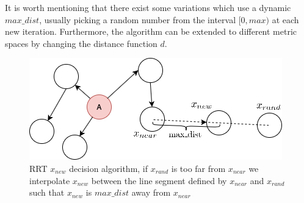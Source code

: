 It is worth mentioning that there exist some variations which use a dynamic $max\_dist$, usually picking a random number from the interval $[0, max)$ at each new iteration. Furthermore, the algorithm can be extended to different metric spaces by changing the distance function $d$.

\begin{figure}[]
  \centering
  \includegraphics[scale=0.4]{images/RRT_new_node.png}
  \caption{RRT $x_{new}$ decision algorithm, if $x_{rand}$ is too far from $x_{near}$ we interpolate $x_{new}$ between the line segment defined by $x_{near}$ and $x_{rand}$ such that $x_{new}$ is $max\_dist$ away from $x_{near}$}
  \label{fig:RRT_new_node}
\end{figure}

